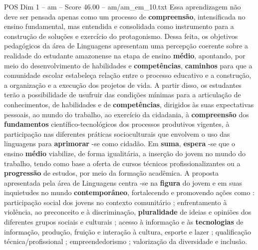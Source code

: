 \begin{textsample}{POS Dim 1 – am – Score 46.00 – am/am\_em\_10.txt}
Essa aprendizagem não deve ser pensada apenas como um processo de \textbf{compreensão}, intensificada no ensino fundamental, mas entendida e consolidada como instrumento para a construção de soluções e exercício do protagonismo.
Dessa feita, os objetivos pedagógicos da área de Linguagens apresentam uma percepção coerente sobre a realidade do estudante amazonense na etapa de ensino \textbf{médio}, apontando, por meio do desenvolvimento de habilidades e \textbf{competências}, \textbf{caminhos} para que a comunidade escolar estabeleça relação entre o processo educativo e a construção, a organização e a execução dos projetos de vida.
A partir disso, os estudantes terão a possibilidade de usufruir das condições mínimas para a articulação de conhecimentos, de habilidades e de \textbf{competências}, dirigidos às suas expectativas pessoais, ao mundo do trabalho, ao exercício da cidadania, à \textbf{compreensão} dos \textbf{fundamentos} científico-tecnológicos dos processos produtivos vigentes, à participação nas diferentes práticas socioculturais que envolvem o uso das linguagens para \textbf{aprimorar} -se como cidadão.
Em \textbf{suma}, \textbf{espera} -se que o ensino \textbf{médio} viabilize, de forma igualitária, a inserção do jovem no mundo do trabalho, tendo como base a oferta de cursos técnicos profissionalizantes ou a \textbf{progressão} de estudos, por meio da formação acadêmica.
A proposta apresentada pela área de Linguagens centra -se na \textbf{figura} do jovem e em suas inquietudes no mundo \textbf{contemporâneo}, fortalecendo e promovendo ações como : participação social dos jovens no contexto comunitário ; enfrentamento à violência, ao preconceito e à discriminação, \textbf{pluralidade} de ideias e opiniões dos diferentes grupos sociais e culturais ; acesso à informação e às \textbf{tecnologias} de informação, produção, fruição e interação à cultura, esporte e lazer ; qualificação técnica/profissional ; empreendedorismo ; valorização da diversidade e inclusão.

\end{textsample}
